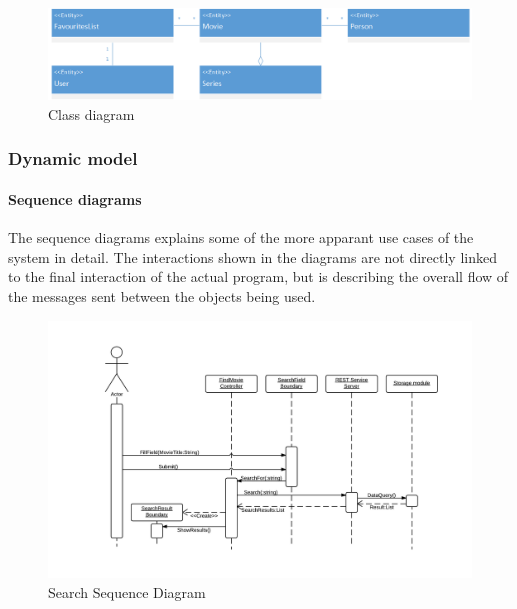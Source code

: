 \begin{figure}[H]
\includegraphics[width=\linewidth]{img/RAD/ClassDiagram.png}
\caption{Class diagram}
\label{fig:Class diagram}
\end{figure}

\subsubsection{Dynamic model}

\paragraph{Sequence diagrams}

The sequence diagrams explains some of the more apparant use cases of the system in detail. The interactions shown in the diagrams are not directly linked to the final interaction of the actual program, but is describing the overall flow of the messages sent between the objects being used.

\begin{figure}[H]
\includegraphics[width=\linewidth]{img/RAD/SearchSequenceDiagram.png}
\caption{Search Sequence Diagram}
\label{fig:Search Sequence Diagram}
\end{figure}

